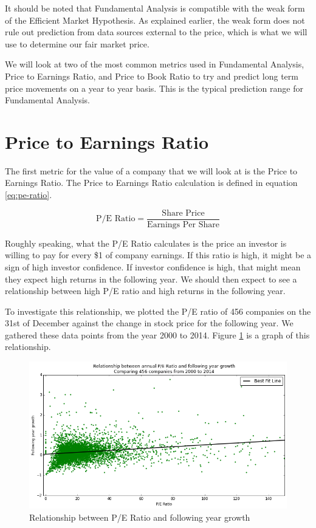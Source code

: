 \documentclass{report}
\begin{document}
It should be noted that Fundamental Analysis is compatible with the weak form of the Efficient Market Hypothesis. As explained earlier, the weak form does not rule out prediction from data sources external to the price, which is what we will use to determine our fair market price.

We will look at two of the most common metrics used in Fundamental Analysis, Price to Earnings Ratio, and Price to Book Ratio to try and predict long term price movements on a year to year basis. This is the typical prediction range for Fundamental Analysis.

\section{Price to Earnings Ratio}

The first metric for the value of a company that we will look at is the Price to Earnings Ratio. The Price to Earnings Ratio calculation is defined in equation \ref{eq:pe-ratio}.

\begin{center}
\begin{equation}
  \text{P/E Ratio} = \dfrac{\text{Share Price}}{\text{Earnings Per Share}}
\end{equation}
\label{eq:pe-ratio}  
\end{center}

Roughly speaking, what the P/E Ratio calculates is the price an investor is willing to pay for every \$1 of company earnings. If this ratio is high, it might be a sign of high investor confidence. If investor confidence is high, that might mean they expect high returns in the following year. We should then expect to see a relationship between high P/E ratio and high returns in the following year.

To investigate this relationship, we plotted the P/E ratio of 456 companies on the 31st of December against the change in stock price for the following year. We gathered these data points from the year 2000 to 2014. Figure \ref{fig:pe-abs} is a graph of this relationship.

\begin{figure}[H]
	\caption{Relationship between P/E Ratio and following year growth}
	\centerline{\includegraphics[width=\textwidth]{vis/pe-ratio-abs.png}}
	\label{fig:pe-abs}
\end{figure}
\end{document}
